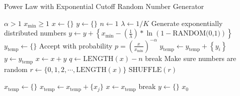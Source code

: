 \begin{algorithm}
\caption{Power Law with Exponential Cutoff Random Number Generator}
\label{alg:pc}
\begin{algorithmic}[1]
\Require $\alpha > 1$
\Require $x_{\text{min}} \ge 1$
        \State $x \gets \{\}$
        \State $y \gets \{\}$
        \State $n \gets 1$
        \State $\lambda \gets 1 / K$
        	 \Comment Generate exponentially distributed numbers
        		\State $y \gets y + \left\{ x_{\text{min}} - \left( \frac{1}{\lambda} \right) * \ln \left(1-\text{RANDOM(0,1)}\right) \right\}$
        	\EndFor
           	\State $y_{\text{temp}} \gets \{\}$
           	 \Comment Accept  with probability $p = \left(\frac{x}{x_{\text{min}}}\right)^{-\alpha}$
                    \State $y_{\text{temp}} \gets y_{\text{temp}} + \left\{y_i\right\}$
                \EndIf
            \EndFor
           	\State $y \gets y_{\text{temp}}$
           	\State $x \gets x + y$
           	\State $q \gets \text{LENGTH}(x) - n$
               	\State break
			\EndIf
           	 \Comment Make sure numbers are random
                \State $r \gets \{0, 1, 2, \cdots, \text{LENGTH}(x)\}$
               	\State $\text{SHUFFLE}(r)$

               	\State $x_{\text{temp}} \gets \{\}$
                        \State $x_{\text{temp}} \gets x_{\text{temp}} + \{x_j\}$
                    \EndIf
                \EndFor
               	\State$x \gets x_{\text{temp}}$
               	\State break
			\EndIf            
               	\State $y \gets \{\}$
            \EndIf
		\EndWhile            
		\State \Return $x_0$
\EndProcedure
\end{algorithmic}
\end{algorithm}
